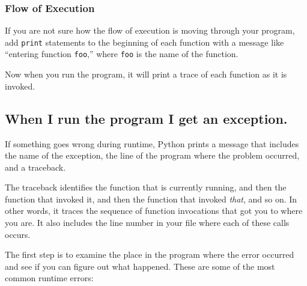 \documentclass[10pt]{book}
\begin{document}
\subsubsection{Flow of Execution}

If you are not sure how the flow of execution is moving through
your program, add {\tt print} statements to the beginning of each
function with a message like ``entering function {\tt foo},'' where
{\tt foo} is the name of the function.

Now when you run the program, it will print a trace of each
function as it is invoked.


\subsection{When I run the program I get an exception.}

If something goes wrong during runtime, Python
prints a message that includes the name of the
exception, the line of the program where the problem occurred,
and a traceback.


The traceback identifies the function that is currently running,
and then the function that invoked it, and then the function that
invoked {\em that}, and so on.  In other words, it traces the
sequence of function invocations that got you to where you are.  It
also includes the line number in your file where each of these
calls occurs.

The first step is to examine the place in the program where
the error occurred and see if you can figure out what happened.
These are some of the most common runtime errors:
\end{document}
